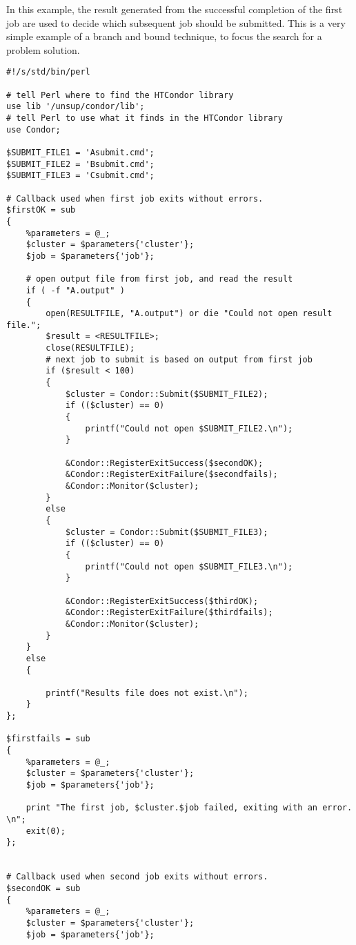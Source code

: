 In this example, the result generated from the successful completion of
the first job are used to decide which subsequent job should be
submitted.
This is a very simple example of a branch and bound technique,
to focus the search for a problem solution.

\footnotesize
\begin{verbatim}
#!/s/std/bin/perl

# tell Perl where to find the HTCondor library
use lib '/unsup/condor/lib';
# tell Perl to use what it finds in the HTCondor library
use Condor;

$SUBMIT_FILE1 = 'Asubmit.cmd';
$SUBMIT_FILE2 = 'Bsubmit.cmd';
$SUBMIT_FILE3 = 'Csubmit.cmd';

# Callback used when first job exits without errors.
$firstOK = sub
{
    %parameters = @_;
    $cluster = $parameters{'cluster'};
    $job = $parameters{'job'};

    # open output file from first job, and read the result
    if ( -f "A.output" )
    {
        open(RESULTFILE, "A.output") or die "Could not open result file.";
        $result = <RESULTFILE>;
        close(RESULTFILE);
        # next job to submit is based on output from first job
        if ($result < 100)
        {
            $cluster = Condor::Submit($SUBMIT_FILE2);
            if (($cluster) == 0)
            {
                printf("Could not open $SUBMIT_FILE2.\n");
            }

            &Condor::RegisterExitSuccess($secondOK);
            &Condor::RegisterExitFailure($secondfails);
            &Condor::Monitor($cluster);
        }
        else
        {
            $cluster = Condor::Submit($SUBMIT_FILE3);
            if (($cluster) == 0)
            {
                printf("Could not open $SUBMIT_FILE3.\n");
            }

            &Condor::RegisterExitSuccess($thirdOK);
            &Condor::RegisterExitFailure($thirdfails);
            &Condor::Monitor($cluster);
        }
    }
    else
    {
        
        printf("Results file does not exist.\n");
    }
};	

$firstfails = sub
{
    %parameters = @_;
    $cluster = $parameters{'cluster'};
    $job = $parameters{'job'};

    print "The first job, $cluster.$job failed, exiting with an error. \n";
    exit(0);
};	


# Callback used when second job exits without errors.
$secondOK = sub
{
    %parameters = @_;
    $cluster = $parameters{'cluster'};
    $job = $parameters{'job'};


\end{verbatim}

